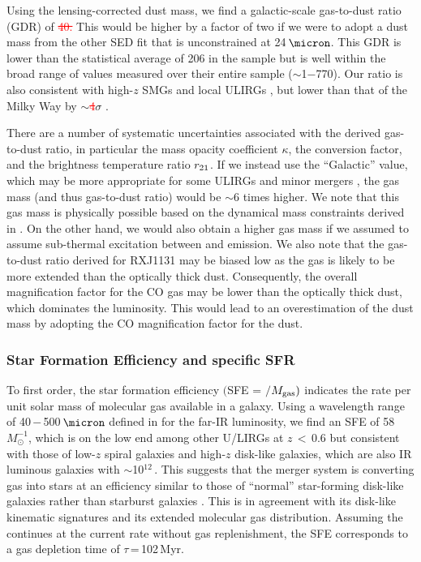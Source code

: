 \documentclass[]{emulateapj}
\newcommand{\new}[1]{\textcolor{blue}{\uwave{#1}}}
\newcommand{\old}[1]{\textcolor{red}{\st{#1}}} %
\begin{document}
Using the lensing-corrected dust mass, we find a galactic-scale
gas-to-dust ratio (GDR) of
\old{40.}\new{54\pmm13}
This would be higher by a factor of two if we were to adopt a dust mass from the other SED fit that is unconstrained at 24\,$\micron$.
This GDR is lower than the statistical average of 206
in the  sample but is well within the broad
range of values measured over their entire sample ($\sim$1$-$770).
Our ratio is also consistent with high-$z$ SMGs
\citep[]{Bothwell13a} and
local ULIRGs \citep{Wilson08a}, but lower than that of the Milky Way by
$\sim$\old{4}\new{7}$\sigma$ \citep[ignoring systematic uncertainties;][]{Li01a,Zubko04a,Draine07a}.

There are a number of systematic uncertainties associated with the derived gas-to-dust ratio, in particular
the mass opacity coefficient $\kappa$,
the \alphaco conversion factor, and the brightness temperature ratio $r_{\rm 21}$.
If we instead use the ``Galactic'' \alphaco value, which may be more appropriate for some ULIRGs \citep[\eg][]{Papadopoulos12a} and minor mergers \citep{Narayanan12a},
the gas mass (and thus gas-to-dust ratio) would be $\sim$6 times higher.
We note that this gas mass is physically possible based on the dynamical mass constraints derived in .
On the other hand, we would also obtain a higher gas mass if
we assumed to assume sub-thermal excitation between \bco and \aco emission.
We also note that the gas-to-dust ratio derived for RXJ1131 may be biased low as the gas is likely to
be more extended than the optically thick dust. Consequently, the overall magnification factor
for the CO gas may be lower than the optically thick dust, which dominates the \fir luminosity.
This would lead to an overestimation of the dust mass
by adopting the CO magnification factor for the dust.

\subsubsection{Star Formation Efficiency and specific SFR}

To first order, the star formation efficiency
$($SFE = \LFIR$/$$M_{\rm gas})$ indicates the \SF rate per unit solar mass of molecular gas available in a galaxy.
Using a wavelength range of 40\,$-$\,500\,$\micron$ defined
in  for the far-IR luminosity,
we find an SFE of 58 \Lsun $M_{\odot}^{-1}$,
which is on the low end among other U/LIRGs at $z$\,$<$\,0.6
\citep[;][]{Combes11a} but consistent with those of
low-$z$ spiral galaxies \citep[$z$\,$<$\,0.1;][]{SV05a} and high-$z$ disk-like
galaxies, which are also IR luminous galaxies with \LIR$\sim$10$^{12}$\,\Msun \citep{Daddi08a, Daddi10a}.
This suggests that the merger system is converting gas into stars at an efficiency
similar to those of ``normal'' star-forming
disk-like galaxies rather than starburst galaxies
\citep[][]{Tacconi08a, Riechers11a}.
This is in agreement with its disk-like kinematic signatures and its extended molecular gas distribution.
Assuming the \SF continues at the current rate without gas replenishment,
the SFE corresponds to a
gas depletion time of $\tau$\,=\,102\,Myr.
\end{document}
